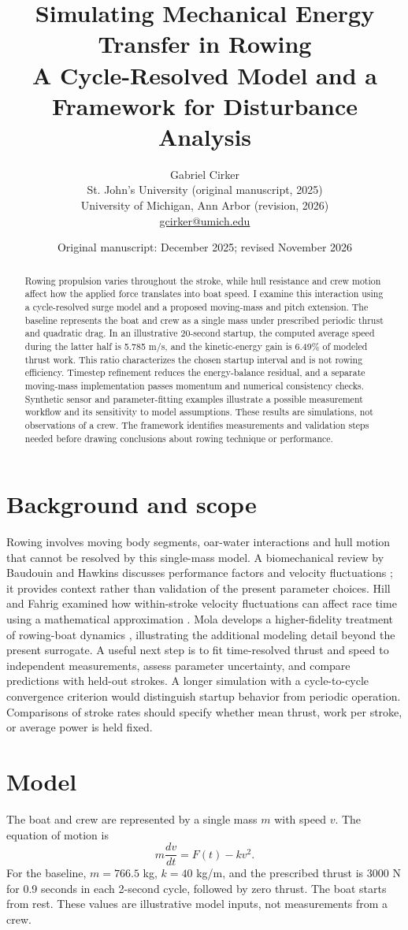 \documentclass[11pt]{article}
\title{Simulating Mechanical Energy Transfer in Rowing\\\large A Cycle-Resolved Model and a Framework for Disturbance Analysis}
\author{Gabriel Cirker\\\small St. John's University (original manuscript, 2025)\\\small University of Michigan, Ann Arbor (revision, 2026)\\\small \href{mailto:gcirker@umich.edu}{gcirker@umich.edu}}
\date{Original manuscript: December 2025; revised November 2026}
\begin{document}
\maketitle
\begin{abstract}
Rowing propulsion varies throughout the stroke, while hull resistance and crew motion affect how the applied force translates into boat speed. I examine this interaction using a cycle-resolved surge model and a proposed moving-mass and pitch extension. The baseline represents the boat and crew as a single mass under prescribed periodic thrust and quadratic drag. In an illustrative 20-second startup, the computed average speed during the latter half is 5.785 m/s, and the kinetic-energy gain is 6.49\% of modeled thrust work. This ratio characterizes the chosen startup interval and is not rowing efficiency. Timestep refinement reduces the energy-balance residual, and a separate moving-mass implementation passes momentum and numerical consistency checks. Synthetic sensor and parameter-fitting examples illustrate a possible measurement workflow and its sensitivity to model assumptions. These results are simulations, not observations of a crew. The framework identifies measurements and validation steps needed before drawing conclusions about rowing technique or performance.
\end{abstract}
\section{Background and scope}
Rowing involves moving body segments, oar-water interactions and hull motion that cannot be resolved by this single-mass model. A biomechanical review by Baudouin and Hawkins discusses performance factors and velocity fluctuations \cite{baudouin}; it provides context rather than validation of the present parameter choices. Hill and Fahrig examined how within-stroke velocity fluctuations can affect race time using a mathematical approximation \cite{hill}. Mola develops a higher-fidelity treatment of rowing-boat dynamics \cite{mola}, illustrating the additional modeling detail beyond the present surrogate. A useful next step is to fit time-resolved thrust and speed to independent measurements, assess parameter uncertainty, and compare predictions with held-out strokes. A longer simulation with a cycle-to-cycle convergence criterion would distinguish startup behavior from periodic operation. Comparisons of stroke rates should specify whether mean thrust, work per stroke, or average power is held fixed.
\section{Model}
The boat and crew are represented by a single mass $m$ with speed $v$. The equation of motion is
\begin{equation}m\frac{dv}{dt}=F(t)-kv^2.\end{equation}
For the baseline, $m=766.5$ kg, $k=40$ kg/m, and the prescribed thrust is 3000 N for 0.9 seconds in each 2-second cycle, followed by zero thrust. The boat starts from rest. These values are illustrative model inputs, not measurements from a crew.
\end{document}
